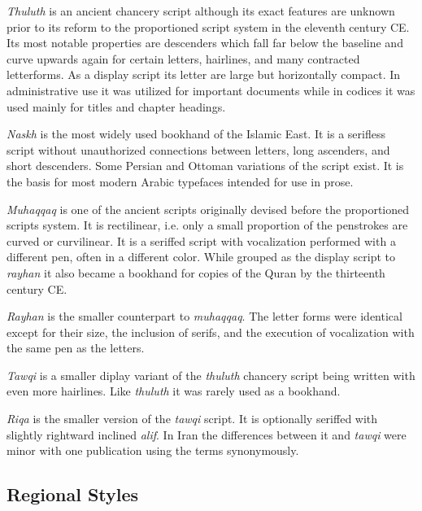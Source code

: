 \emph{Thuluth} is an ancient chancery script although its exact features are
unknown prior to its reform to the proportioned script system in the eleventh
century CE. Its most notable properties are descenders which fall far below the
baseline and curve upwards again for certain letters, hairlines, and many
contracted letterforms. As a display script its letter are large but
horizontally compact. In administrative use it was utilized for important
documents while in codices it was used mainly for titles and chapter
headings\cite[pg. 275]{gacek2009arabic}.

\emph{Naskh} is the most widely used bookhand of the Islamic East. It is a
serifless script without unauthorized connections between letters, long
ascenders, and short descenders. Some Persian and Ottoman variations of the
script exist. It is the basis for most modern Arabic typefaces intended for use
in prose\cite[pg. 162-163]{gacek2009arabic}.

\emph{Muhaqqaq} is one of the ancient scripts originally devised before the
proportioned scripts system. It is rectilinear, i.e. only a small proportion of
the penstrokes are curved or curvilinear. It is a seriffed script with
vocalization performed with a different pen, often in a different color. While
grouped as the display script to \emph{rayhan} it also became a bookhand for
copies of the Quran by the thirteenth century CE\cite[pg. 160-161]{gacek2009arabic}.

\emph{Rayhan} is the smaller counterpart to \emph{muhaqqaq}. The letter forms
were identical except for their size, the inclusion of serifs, and the
execution of vocalization with the same pen as the letters\cite[pg.
308]{EncyclopediaofArabicLanguageandLinguisticsVolume3}.

\emph{Tawqi} is a smaller diplay variant of the \emph{thuluth} chancery script
being written with even more hairlines. Like \emph{thuluth} it was rarely used
as a bookhand\cite[pg. 264-264]{gacek2009arabic}.

\emph{Riqa} is the smaller version of the \emph{tawqi} script. It is optionally
seriffed with slightly rightward inclined \emph{alif}. In Iran the differences
between it and \emph{tawqi} were minor with one publication using the terms
synonymously\cite[pg. 224]{gacek2009arabic}.

\subsection{Regional Styles}

